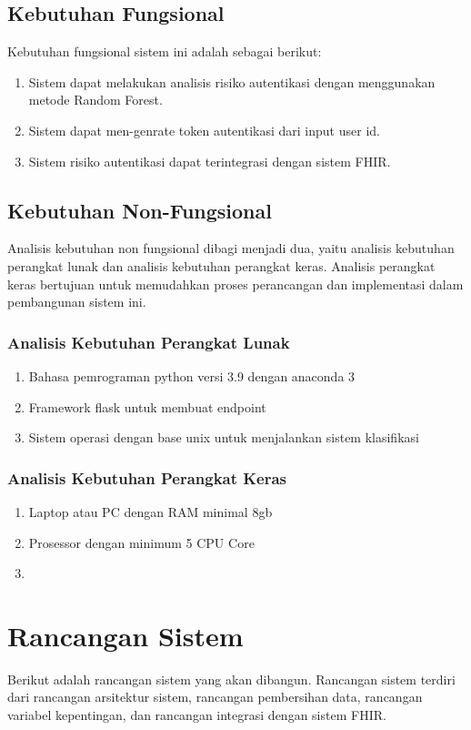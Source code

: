 \subsection{Kebutuhan Fungsional}
Kebutuhan fungsional sistem ini adalah sebagai berikut:
\begin{enumerate}
    \item Sistem dapat melakukan analisis risiko autentikasi dengan menggunakan metode Random Forest.
    \item Sistem dapat men-genrate token autentikasi dari input user id.
    \item Sistem risiko autentikasi dapat terintegrasi dengan sistem FHIR.
\end{enumerate}

\subsection{Kebutuhan Non-Fungsional}
Analisis kebutuhan non fungsional dibagi menjadi dua, yaitu analisis
kebutuhan perangkat lunak dan analisis kebutuhan perangkat keras. Analisis
perangkat keras bertujuan untuk memudahkan proses perancangan dan
implementasi dalam pembangunan sistem ini.

\subsubsection{Analisis Kebutuhan Perangkat Lunak}

\begin{enumerate}
    \item Bahasa pemrograman python versi 3.9 dengan anaconda 3
    \item Framework flask untuk membuat endpoint 
    \item Sistem operasi dengan base unix untuk menjalankan sistem klasifikasi
\end{enumerate}

\subsubsection{Analisis Kebutuhan Perangkat Keras}
\begin{enumerate}
    \item Laptop atau PC dengan RAM minimal 8gb
    \item Prosessor dengan minimum 5 CPU Core 
    \item 
\end{enumerate}

\section{Rancangan Sistem}
Berikut adalah rancangan sistem yang akan dibangun. Rancangan sistem terdiri dari rancangan arsitektur sistem, rancangan pembersihan data, rancangan variabel kepentingan, dan rancangan integrasi dengan sistem FHIR.

